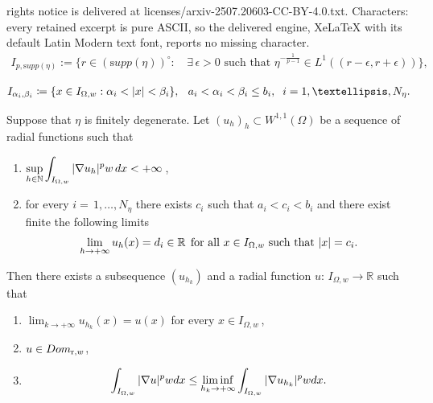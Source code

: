 \documentclass[10pt,a4paper]{amsart}
\def\de{{\rm d}}
\newcommand{\bbN}{{\mathbb{N}}}
\newcommand{\bbR}{{\mathbb{R}}}
\begin{document}
rights notice is delivered at licenses/arxiv-2507.20603-CC-BY-4.0.txt. Characters: every retained excerpt is pure ASCII, so the delivered engine, XeLaTeX with its default Latin Modern text font, reports no missing character.
\begin{align}
\label{decomposet}
I_{p,{\mathrm supp}(\eta)}:=\Big\{r\in({\mathrm supp}(\eta))^{\circ}:\,&\exists\,\epsilon >0\text{ such that }
\eta^{-\frac{1}{p-1}}\in L^1\left((r-\epsilon ,r+\epsilon )\right)\Big\},
\end{align}

\begin{align}
\label{newset}
I_{\alpha_{i},\beta_{i}}\coloneqq \{x\in I_{\Omega,w}: \alpha_{i}<\vert x\vert< \beta_{i}\}, \hskip 0,2cm\, a_{i}<\alpha_{i}<\beta_{i}\leq b_{i}, \hskip 0,2cm i=1,\ldots, N_{\eta}.
\end{align}

\begin{lem}\label {lemma2} 
Suppose that $\eta$ is finitely degenerate. Let $(u_h)_h\subset W^{1,1}(\Omega)$ be a sequence of radial functions such that
\begin{enumerate}
\item[(a)] $\displaystyle\sup_{h\in\bbN}\int_{I_{\Omega,w}}|\nabla u_h|^{p}w\,\de x<+\infty$\,,
\item[(b)] for every $i=\,1,\dots,N_\eta$ there exists $c_i$ such that $a_i< c_i<b_i$ and there exist finite the following limits
$$
\lim_{h\to+\infty}u_h(x)=d_i\in \bbR\, \hskip 0,1cm \text{for all $x\in I_{\Omega,w}$ such that $\vert x\vert=c_{i}$}.
$$
\end{enumerate}
Then there exists a subsequence $(u_{h_k})$ and a radial function 
$u:\,I_{\Omega,w}\to\bbR$ such that 
\begin{enumerate}
\item[(i)] $\displaystyle\lim_{k\to+\infty}u_{h_k}(x) =u(x) $ for every $x\in I_{\Omega,w}$\,,
\item[(ii)] $u\in {\rm{Dom}}_{{\mathrm r},w}$,
\item[(iii)]
\begin{align*}
\displaystyle\int_{I_{\Omega,w}}\vert \nabla u \vert^{p}w\de x\leq \liminf_{h_{k}\rightarrow +\infty}\displaystyle\int_{I_{\Omega,w}}\vert \nabla u_{h_{k}}\vert^{p}w\de x.
\end{align*}
\end{enumerate}
\end{lem}
\end{document}
